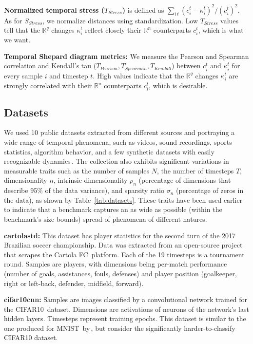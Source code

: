 \noindent\textbf{Normalized temporal stress ($T_{Stress}$)} is defined as $\sum_{i\, t}{(c_{i}^{t}-\kappa_{i}^{t})^{2}} / { (c_{i}^t)^{2}}$. As for $S_{Stress}$, we normalize distances using standardization. Low $T_{Stress}$ values tell that the $\mathbb{R}^q$ changes $\kappa_i^t$ reflect closely their $\mathbb{R}^n$ counterparts ${c_i^t}$, which is what we want.

\noindent\textbf{Temporal Shepard diagram metrics:} We measure the Pearson and Spearman correlation and Kendall's tau ($T_{Pearson}, T_{Spearman}, T_{Kendall}$) 
between $c_i^t$ and $\kappa_i^t$ for every sample $i$ and timestep $t$. High values indicate that the $\mathbb{R}^q$ changes $\kappa_i^t$ are strongly correlated with their $\mathbb{R}^n$ counterparts $c_i^t$, which is desirable.

\subsection{Datasets}
\label{sec:datasets}
%
We used 10 public datasets extracted from different sources and portraying a wide range of temporal phenomena, such as videos, sound recordings, sports statistics, algorithm behavior, and a few synthetic datasets with easily recognizable dynamics\,\citep{repo-guided}. The collection also exhibits significant variations in measurable traits such as the number of samples $N$, the number of timesteps $T$, dimensionality $n$, intrinsic dimensionality $\rho_n$ (percentage of dimensions that describe 95\% of the data variance), and sparsity ratio $\sigma_n$ (percentage of zeros in the data), as shown by Table~\ref{tab:datasets}. These traits have been used earlier\,\citep{Espadoto19} to indicate that a benchmark captures an as wide as possible (within the benchmark's size bounds) spread of phenomena of different natures.

\noindent\textbf{cartolastd:} This dataset has player statistics for the second turn of the 2017 Brazilian soccer championship. Data was extracted from an open-source project\,\citep{dataset:cartola} that scrapes the Cartola FC\,\citep{dataset:cartola} platform. Each of the 19 timesteps is a tournament round. Samples are players, with dimensions being per-match performance (number of goals, assistances, fouls, defenses) and player position (goalkeeper, right or left-back, defender, midfield, forward).

\noindent\textbf{cifar10cnn:} Samples are images classified by a convolutional network trained for the CIFAR10\,\citep{dataset:cifar10} dataset. 
Dimensions are activations of neurons of the network's last hidden layers. Timesteps represent training epochs. This dataset is similar to the one produced for MNIST\,\citep{dataset:mnist} by\,\cite{Rauber2017}, but consider the significantly harder-to-classify CIFAR10 dataset.

